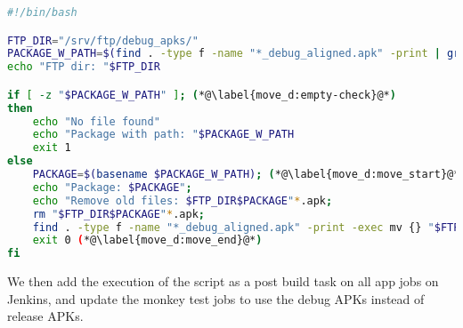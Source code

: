 \begin{lstlisting}[language=bash,showstringspaces=false,caption=Script that moves the debug APK to the ftp server,label=lst:move_debug_apk]
#!/bin/bash

FTP_DIR="/srv/ftp/debug_apks/"
PACKAGE_W_PATH=$(find . -type f -name "*_debug_aligned.apk" -print | grep ".+(?=_v[0-9]+\.[0-9]+b[0-9]+_debug_aligned\.apk)" -Po) (*@\label{move_d:package}@*)
echo "FTP dir: "$FTP_DIR

if [ -z "$PACKAGE_W_PATH" ]; (*@\label{move_d:empty-check}@*)
then
    echo "No file found"
    echo "Package with path: "$PACKAGE_W_PATH
    exit 1
else
    PACKAGE=$(basename $PACKAGE_W_PATH); (*@\label{move_d:move_start}@*)
    echo "Package: $PACKAGE";
    echo "Remove old files: $FTP_DIR$PACKAGE"*.apk;
    rm "$FTP_DIR$PACKAGE"*.apk;
    find . -type f -name "*_debug_aligned.apk" -print -exec mv {} "$FTP_DIR" \;
    exit 0 (*@\label{move_d:move_end}@*)
fi
\end{lstlisting}

We then add the execution of the script as a post build task on all app jobs on Jenkins, and update the monkey test jobs to use the debug APKs instead of release APKs.